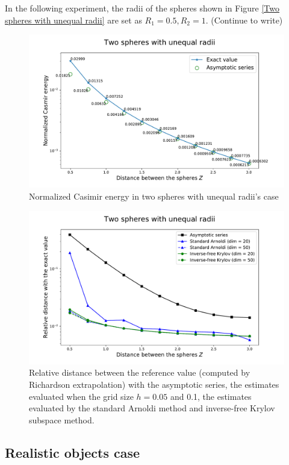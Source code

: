 In the following experiment, the radii of the spheres shown in Figure \ref{Two spheres with unequal radii} are set as $R_{1} = 0.5, R_{2} = 1$. (Continue to write)
\begin{figure}[H]
    \includegraphics[scale = 0.7]{figures/Spheres_unequal_CasE.pdf}
    \caption{Normalized Casimir energy in two spheres with unequal radii's case}
\end{figure}

\begin{figure}[H]
    \includegraphics[scale = 0.7]{figures/relative_distance_unequal_radii.pdf}
    \caption{Relative distance between the reference value (computed by Richardson extrapolation) with the asymptotic series, the estimates evaluated when the 
    grid size $h = 0.05$ and 0.1, the estimates evaluated by the standard Arnoldi method and inverse-free Krylov subspace method.}
    \label{unequal_radii_rel_dist}
\end{figure}
\subsection{Realistic objects case}



